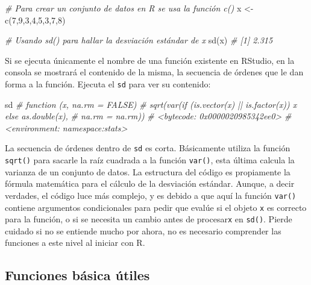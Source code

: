 \documentclass[
]{article}
\newenvironment{Shaded}{\begin{snugshade}}{\end{snugshade}}
\newcommand{\CommentTok}[1]{\textcolor[rgb]{0.56,0.35,0.01}{\textit{#1}}}
\newcommand{\DecValTok}[1]{\textcolor[rgb]{0.00,0.00,0.81}{#1}}
\newcommand{\FunctionTok}[1]{\textcolor[rgb]{0.00,0.00,0.00}{#1}}
\newcommand{\NormalTok}[1]{#1}
\newcommand{\OtherTok}[1]{\textcolor[rgb]{0.56,0.35,0.01}{#1}}
\theoremstyle{definition}
\theoremstyle{definition}
\theoremstyle{definition}
\theoremstyle{definition}
\theoremstyle{remark}
\begin{document}
\begin{Shaded}
\begin{Highlighting}[]
\CommentTok{\# Para crear un conjunto de datos en R se usa la función c()}
\NormalTok{x }\OtherTok{\textless{}{-}} \FunctionTok{c}\NormalTok{(}\DecValTok{7}\NormalTok{,}\DecValTok{9}\NormalTok{,}\DecValTok{3}\NormalTok{,}\DecValTok{4}\NormalTok{,}\DecValTok{5}\NormalTok{,}\DecValTok{3}\NormalTok{,}\DecValTok{7}\NormalTok{,}\DecValTok{8}\NormalTok{)}

\CommentTok{\# Usando sd() para hallar la desviación estándar de x}
\FunctionTok{sd}\NormalTok{(x)}
\CommentTok{\# [1] 2.315}
\end{Highlighting}
\end{Shaded}

Si se ejecuta únicamente el nombre de una función existente en RStudio, en la consola se mostrará el contenido de la misma, la secuencia de órdenes que le dan forma a la función. Ejecuta el \texttt{sd} para ver su contenido:

\begin{Shaded}
\begin{Highlighting}[]
\NormalTok{sd}
\CommentTok{\# function (x, na.rm = FALSE) }
\CommentTok{\# sqrt(var(if (is.vector(x) || is.factor(x)) x else as.double(x), }
\CommentTok{\#     na.rm = na.rm))}
\CommentTok{\# \textless{}bytecode: 0x0000020985342ee0\textgreater{}}
\CommentTok{\# \textless{}environment: namespace:stats\textgreater{}}
\end{Highlighting}
\end{Shaded}

La secuencia de órdenes dentro de \texttt{sd} es corta. Básicamente utiliza la función \texttt{sqrt()} para sacarle la raíz cuadrada a la función \texttt{var()}, esta última calcula la varianza de un conjunto de datos. La estructura del código es propiamente la fórmula matemática para el cálculo de la desviación estándar. Aunque, a decir verdades, el código luce más complejo, y es debido a que aquí la función \texttt{var()} contiene argumentos condicionales para pedir que evalúe si el objeto \texttt{x} es correcto para la función, o si se necesita un cambio antes de procesar\texttt{x} en \texttt{sd()}. Pierde cuidado si no se entiende mucho por ahora, no es necesario comprender las funciones a este nivel al iniciar con R.

\hypertarget{funciones-buxe1sica-uxfatiles}{%
\subsection{Funciones básica útiles}\label{funciones-buxe1sica-uxfatiles}}
\end{document}

